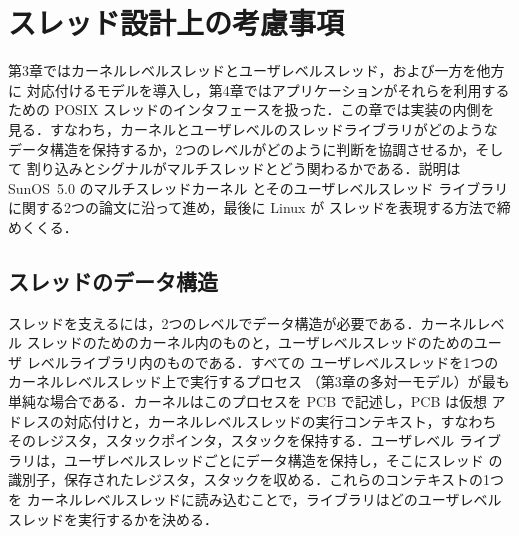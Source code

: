 \documentclass[../main.tex]{subfiles}
\begin{document}
\chapter{スレッド設計上の考慮事項}

第3章ではカーネルレベルスレッドとユーザレベルスレッド，および一方を他方に
対応付けるモデルを導入し，第4章ではアプリケーションがそれらを利用する
ための POSIX スレッドのインタフェースを扱った．この章では実装の内側を
見る．すなわち，カーネルとユーザレベルのスレッドライブラリがどのような
データ構造を保持するか，2つのレベルがどのように判断を協調させるか，そして
割り込みとシグナルがマルチスレッドとどう関わるかである．説明は SunOS~5.0
のマルチスレッドカーネル \cite{eykholt1992} とそのユーザレベルスレッド
ライブラリ \cite{stein1992} に関する2つの論文に沿って進め，最後に Linux が
スレッドを表現する方法で締めくくる．

\section{スレッドのデータ構造}
\label{sec:l05-structures}

スレッドを支えるには，2つのレベルでデータ構造が必要である．カーネルレベル
スレッドのためのカーネル内のものと，ユーザレベルスレッドのためのユーザ
レベルライブラリ内のものである．すべての
ユーザレベルスレッドを1つのカーネルレベルスレッド上で実行するプロセス
（第3章の多対一モデル）が最も単純な場合である．カーネルはこのプロセスを PCB で記述し，PCB は仮想
アドレスの対応付けと，カーネルレベルスレッドの実行コンテキスト，すなわち
そのレジスタ，スタックポインタ，スタックを保持する．ユーザレベル
ライブラリは，ユーザレベルスレッドごとにデータ構造を保持し，そこにスレッド
の識別子，保存されたレジスタ，スタックを収める．これらのコンテキストの1つを
カーネルレベルスレッドに読み込むことで，ライブラリはどのユーザレベル
スレッドを実行するかを決める．
\end{document}
